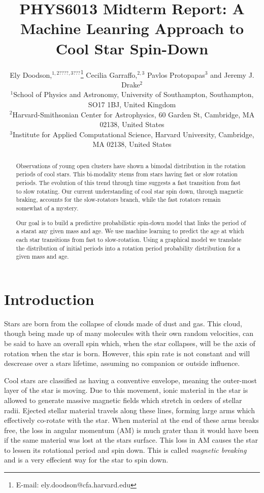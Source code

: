 \documentclass[fleqn,usenatbib]{mnras}
\title{PHYS6013 Midterm Report: A Machine Leanring Approach to Cool Star Spin-Down}
\author[E. Doodson et al.]{
Ely Doodson,$^{1,2????,3???}$\thanks{E-mail: ely.doodson@cfa.harvard.edu}
Cecilia Garraffo,$^{2,3}$
Pavlos Protopapas$^{3}$
and Jeremy J. Drake$^{2}$
\\
$^{1}$School of Physics and Astronomy, University of Southampton,
Southampton, SO17 1BJ, United Kingdom\\
$^{2}$Harvard-Smithsonian Center for Astrophysics, 60 Garden St, Cambridge, MA 02138, United States \\
$^{3}$Institute for Applied Computational Science, Harvard University, Cambridge, MA 02138, United States
}
\begin{document}
\label{firstpage}
\pagerange{\pageref{firstpage}--\pageref{lastpage}}
\maketitle

\begin{abstract}
	Observations of young open clusters have shown a bimodal distribution in the rotation
	periods of cool stars.
	This bi-modality stems from stars having fast or slow rotation periods.
	The evolution of this trend through time suggests a fast transition from fast to slow rotating.
	Our current understanding of cool star spin down, through magnetic braking, accounts for the slow-rotators branch, while the fast rotators remain somewhat of a mystery.

	Our goal is to build a predictive probabilistic spin-down model that links the period of a starat any given mass and age.
	We use machine learning to predict the age at which each star transitions from fast to slow-rotation.
	Using a graphical model we translate the distribution of initial periods into a rotation period probability distribution for a given mass and age.
\end{abstract}


\section{Introduction}
Stars are born from the collapse of clouds made of dust and gas.
This cloud, though being made up of many molecules with their own random velocities, can be said to have an overall spin which, when the star collapses, will be the axis of rotation when the star is born.
However, this spin rate is not constant and will descrease over a stars lifetime, assuming no companion or outside influence.

Cool stars are classified as having a conventive envelope, meaning the outer-most layer of the star is moving.
Due to this movement, ionic material in the star is allowed to generate massive magnetic fields which stretch in orders of stellar radii.
Ejected stellar material travels along these lines, forming large arms which effectively co-rotate with the star.
When material at the end of these arms breaks free, the loss in angular momentum (AM) is much grater than it would have been if the same material was lost at the stars surface.
This loss in AM causes the star to lessen its rotational period and spin down.
This is called \textit{magnetic breaking} and is a very effecient way for the star to spin down.
\end{document}
